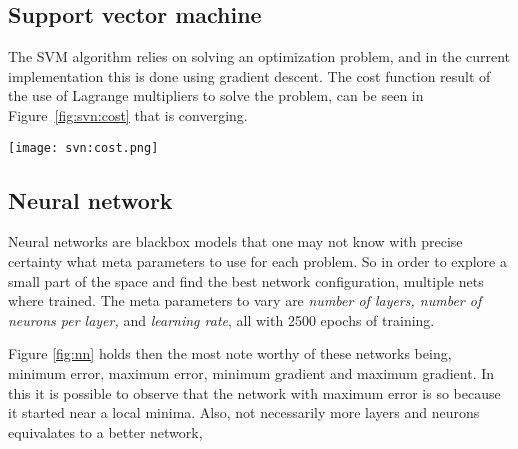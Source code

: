
\subsection{Support vector machine}

The SVM algorithm relies on solving an optimization problem, and in the current
implementation this is done using gradient descent. The cost function result
of the use of Lagrange multipliers to solve the problem, can be seen in
Figure~\ref{fig:svn:cost} that is converging.

\begin{figure*}[t]
    \texttt{[image: svn:cost.png]}
    \caption{Cost function of the optimization problem for SVM
    \label{fig:svn:cost}}
\end{figure*}

\subsection{Neural network}

Neural networks are blackbox models that one may not know with precise certainty
what meta parameters to use for each problem. So in order to explore a small
part of the space and find the best network configuration, multiple nets where
trained. The meta parameters to vary are \textit{number of layers, number of
neurons per layer,} and \textit{learning rate}, all with 2500 epochs of
training. 

Figure \ref{fig:nn} holds then the most note worthy of these networks
being, minimum error, maximum error, minimum gradient and maximum gradient.
In this it is possible to observe that the network with maximum error is so
because it started near a local minima. Also, not necessarily more layers and
neurons equivalates to a better network,   

